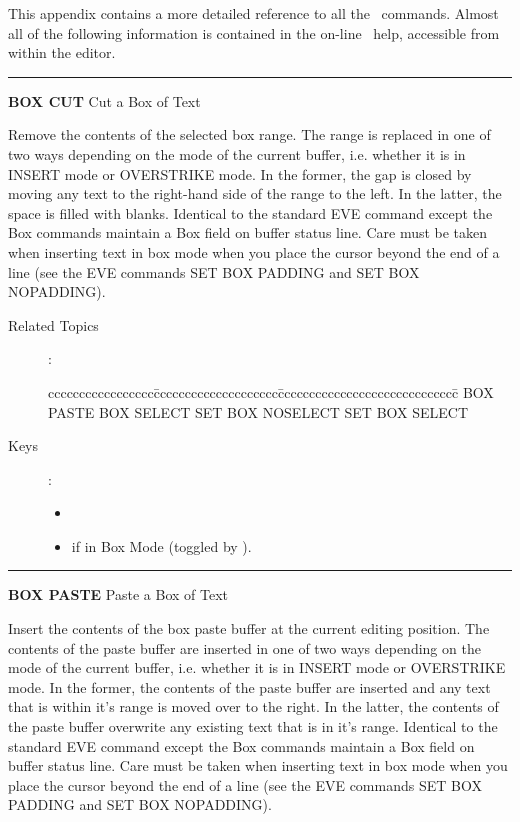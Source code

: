 This appendix contains a more detailed reference to all the \STEve\ commands.
Almost all of the following information is contained in the on-line \STEve\
help, accessible from within the editor.

\bigskip

\rule{\textwidth}{0.3mm}

{\Large {\bf BOX CUT} \hfill Cut a Box of Text}

\medskip
Remove the contents of the selected box range. The range is replaced in one of
two ways depending on the mode of the current buffer, i.e. whether it is in
INSERT mode or OVERSTRIKE mode. In the former, the gap is closed by moving any
text to the right-hand side of the range to the left. In the latter, the space
is filled with blanks. Identical to the standard EVE command except the Box
commands maintain a Box field on buffer status line. Care must be taken when
inserting text in box mode when you place the cursor beyond the end of a line
(see the EVE commands SET BOX PADDING and SET BOX NOPADDING).

\begin{description}
\item[Related Topics]:
\begin{tabbing}
ccccccccccccccccc\=cccccccccccccccccccc\=ccccccccccccccccccccccccccccc\=\kill
BOX PASTE      \> BOX SELECT   \> SET BOX NOSELECT  \>   SET BOX SELECT \\
\end{tabbing}
\item[Keys]:
           \begin{itemize}
           \item \gold\ 
           \item \keyname{Remove} if in Box Mode (toggled by  ).
           \end{itemize}

\end{description}

\goodbreak

\rule{\textwidth}{0.3mm}

{\Large {\bf BOX PASTE} \hfill Paste a Box of Text}

\medskip
Insert the contents of the box paste buffer at the current editing position.
The contents of the paste buffer are inserted in one of two ways depending on
the mode of the current buffer, i.e. whether it is in INSERT mode or OVERSTRIKE
mode. In the former, the contents of the paste buffer are inserted and any text
that is within it's range is moved over to the right. In the latter, the
contents of the paste buffer overwrite any existing text that is in it's range.
Identical to the standard EVE command except the Box commands maintain a Box
field on buffer status line. Care must be taken when inserting text in box mode
when you place the cursor beyond the end of a line (see the EVE commands SET
BOX PADDING and SET BOX NOPADDING).

